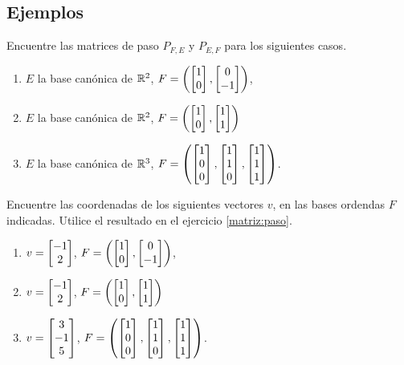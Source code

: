 \subsection*{Ejemplos}

\begin{resuelto}
 \label{matriz:paso}
 Encuentre las matrices de paso $P_{F,E}$ y $P_{E,F}$ para los siguientes casos.
  \begin{enumerate}
  \item $E$ la base canónica de $\mathbb{R}^{2}$, $F=\left(\begin{bmatrix}1\\0\end{bmatrix},\begin{bmatrix}0\\-1\end{bmatrix}\right)$,
  \item $E$ la base canónica de $\mathbb{R}^{2}$, $F=\left(\begin{bmatrix}1\\0\end{bmatrix},\begin{bmatrix}1\\1\end{bmatrix}\right)$
  \item $E$ la base canónica de $\mathbb{R}^{3}$, $F=\left(\begin{bmatrix}1\\0\\0\end{bmatrix},\begin{bmatrix}1\\1\\0\end{bmatrix},\begin{bmatrix}1\\1\\1\end{bmatrix}\right)$.
 \end{enumerate}

\end{resuelto}


\begin{resuelto}
 Encuentre las coordenadas de los siguientes vectores $v$, en las bases ordendas $F$ indicadas. Utilice el resultado en
el ejercicio \ref{matriz:paso}.
 \begin{enumerate}
  \item $v=\begin{bmatrix}-1\\2\end{bmatrix}$, $F=\left(\begin{bmatrix}1\\0\end{bmatrix},\begin{bmatrix}0\\-1\end{bmatrix}\right)$,
  \item $v=\begin{bmatrix}-1\\2\end{bmatrix}$, $F=\left(\begin{bmatrix}1\\0\end{bmatrix},\begin{bmatrix}1\\1\end{bmatrix}\right)$
  \item $v=\begin{bmatrix}3\\-1\\5\end{bmatrix}$, $F=\left(\begin{bmatrix}1\\0\\0\end{bmatrix},\begin{bmatrix}1\\1\\0\end{bmatrix},\begin{bmatrix}1\\1\\1\end{bmatrix}\right)$.
 \end{enumerate}

\end{resuelto}

